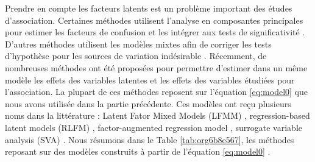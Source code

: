 \documentclass[12pt,a4paper,twoside]{ugathesis}
\begin{document}
Prendre en compte les facteurs latents est un problème important des études
d'association. Certaines méthodes utilisent l'analyse en composantes principales
pour estimer les facteurs de confusion et les intégrer aux tests de
significativité \citep{Rahmani_2016,Price_2006}. D'autres méthodes utilisent les
modèles mixtes afin de corriger les tests d'hypothèse pour les sources de
variation indésirable \citep{Kang_2008,Zhou_2014,Loh194944}. Récemment, de
nombreuses méthodes ont été proposées pour permettre d'estimer dans un même
modèle les effets des variables latentes et les effets des variables étudiées
pour l'association. La plupart de ces méthodes reposent sur l'équation
\eqref{eq:model0} que nous avons utilisée dans la partie précédente. Ces modèles
ont reçu plusieurs noms dans la littérature : Latent Fator Mixed Models (LFMM)
\citep{Frichot_2013}, regression-based latent models (RLFM)
\citep{agarwal09_regres}, factor-augmented regression model
\citep{gerard2017empirical}, surrogate variable analysis (SVA)
\citep{article_Leek_Storey_2007}. Nous résumons dans le Table
\ref{tab:org6b8e567}, les méthodes reposant sur des modèles construits à
partir de l'équation \eqref{eq:model0} .
\end{document}
